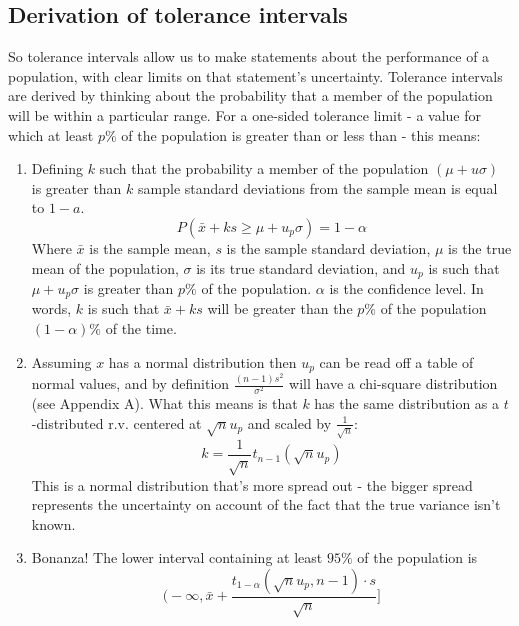\documentclass[11pt,a4paper,article]{memoir} %
\begin{document}
\subsection{Derivation of tolerance intervals}
So tolerance intervals allow us to make statements about the performance of a population, with clear limits on that statement's uncertainty. Tolerance intervals are derived by thinking about the probability that a member of the population will be within a particular range. For a one-sided tolerance limit - a value for which at least $p\%$ of the population is greater than or less than - this means:
\begin{enumerate}
	\item Defining $k$ such that the probability a member of the population $(\mu + u \sigma)$ is greater than $k$ sample standard deviations from the sample mean is equal to $1 - a$.
		\begin{equation}
			P(\bar{x} + ks \geq \mu + u_p \sigma) = 1 - \alpha
			\label{eq:tol_interval}
		\end{equation}
	Where $\bar{x}$ is the sample mean, $s$ is the sample standard deviation, $\mu$ is the true mean of the population, $\sigma$ is its true standard deviation, and $u_p$ is such that $\mu + u_p\sigma$ is greater than $p\%$ of the population. $\alpha$ is the confidence level. \newline In words, $k$ is such that $\bar{x} + ks$ will  be greater than the $p\%$ of the population $(1 - \alpha)\%$ of the time.
	\item Assuming $x$ has a normal distribution then $u_p$ can be read off a table of normal values, and by definition $\frac{(n-1)s^2}{\sigma^2}$ will have a chi-square distribution (see Appendix A). What this means is that $k$ has the same distribution as a $t$-distributed r.v. centered at $\sqrt{n}u_p$ and scaled by $\frac{1}{\sqrt{n}}$:
		\begin{equation}
			k = \frac{1}{\sqrt{n}}t_{n - 1}(\sqrt{n}u_p) 
		\end{equation}
		This is a normal distribution that's more spread out - the bigger spread represents the uncertainty on account of the fact that the true variance isn't known.
	\item  Bonanza! The lower interval containing at least $95\%$  of the population is
\begin{equation}
	\Big(-\infty, \bar{x} + \frac{t_{1 - \alpha}(\sqrt{n}u_p, n - 1)\cdot s}{\sqrt{n}}\Big]
\end{equation}
\end{enumerate}
\end{document}
